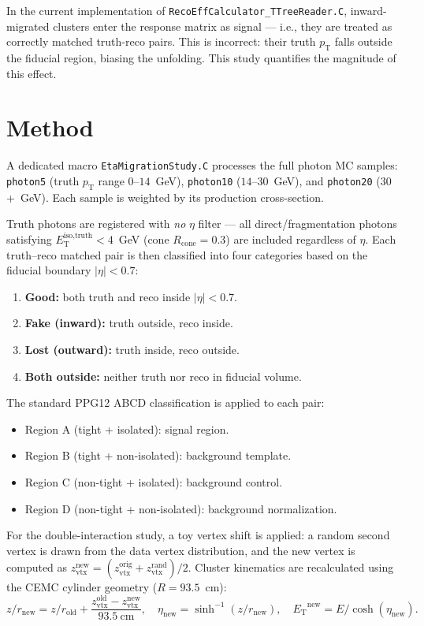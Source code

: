 \documentclass[11pt,letterpaper]{article}
\newcommand{\pT}{\ensuremath{p_{\text{T}}}}
\newcommand{\ET}{\ensuremath{E_{\text{T}}}}
\newcommand{\abseta}{\ensuremath{|\eta|}}
\newcommand{\isoETtruth}{\ensuremath{E_\text{T}^\text{iso,truth}}}
\newcommand{\Rcone}{\ensuremath{R_{\text{cone}}}}
\begin{document}
In the current implementation of \texttt{RecoEffCalculator\_TTreeReader.C},
inward-migrated clusters enter the response matrix as signal --- i.e., they are
treated as correctly matched truth-reco pairs. This is incorrect: their truth
$\pT$ falls outside the fiducial region, biasing the unfolding. This study
quantifies the magnitude of this effect.

\section{Method}
\label{sec:method}

A dedicated macro \texttt{EtaMigrationStudy.C} processes the full photon MC
samples: \texttt{photon5} (truth $\pT$ range $0$--$14$~GeV), \texttt{photon10}
($14$--$30$~GeV), and \texttt{photon20} ($30$+~GeV). Each sample is weighted by
its production cross-section.

Truth photons are registered with \emph{no} $\eta$ filter --- all
direct/fragmentation photons satisfying $\isoETtruth < 4$~GeV (cone
$\Rcone = 0.3$) are included regardless of $\eta$. Each truth--reco matched
pair is then classified into four categories based on the fiducial boundary
$\abseta < 0.7$:
\begin{enumerate}
  \item \textbf{Good:} both truth and reco inside $\abseta < 0.7$.
  \item \textbf{Fake (inward):} truth outside, reco inside.
  \item \textbf{Lost (outward):} truth inside, reco outside.
  \item \textbf{Both outside:} neither truth nor reco in fiducial volume.
\end{enumerate}

The standard PPG12 ABCD classification is applied to each pair:
\begin{itemize}
  \item Region A (tight + isolated): signal region.
  \item Region B (tight + non-isolated): background template.
  \item Region C (non-tight + isolated): background control.
  \item Region D (non-tight + non-isolated): background normalization.
\end{itemize}

For the double-interaction study, a toy vertex shift is applied: a random second
vertex is drawn from the data vertex distribution, and the new vertex is
computed as $z_\text{vtx}^\text{new} = (z_\text{vtx}^\text{orig} +
z_\text{vtx}^\text{rand}) / 2$. Cluster kinematics are recalculated using the
CEMC cylinder geometry ($R = 93.5$~cm):
\begin{equation}
  z/r_\text{new} = z/r_\text{old} + \frac{z_\text{vtx}^\text{old} - z_\text{vtx}^\text{new}}{93.5~\text{cm}},
  \quad
  \eta_\text{new} = \sinh^{-1}(z/r_\text{new}),
  \quad
  \ET^\text{new} = E / \cosh(\eta_\text{new}).
\end{equation}
\end{document}
